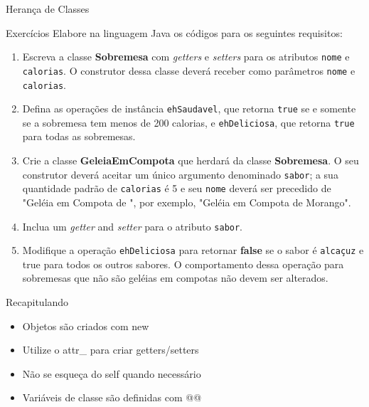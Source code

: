 \begin{frame}{Herança de Classes}    
  
 
\end{frame}

\begin{frame}{Exercícios}
Elabore na linguagem Java os códigos para os seguintes requisitos:
    \begin{enumerate}
          \item Escreva a classe \textbf{Sobremesa} com \textit{getters} e \textit{setters} para os atributos \texttt{nome} e \texttt{calorias}. O construtor dessa classe deverá receber como parâmetros \texttt{nome} e \texttt{calorias}.      
          \item Defina as operações de instância \texttt{ehSaudavel}, que retorna \texttt{true} se e somente se a sobremesa tem menos de 200 calorias, e \texttt{ehDeliciosa}, que retorna \texttt{true} para todas as sobremesas.
          \item Crie a classe \textbf{GeleiaEmCompota} que herdará da classe \textbf{Sobremesa}. O seu construtor deverá aceitar um único argumento denominado \texttt{sabor};  a sua quantidade padrão de \texttt{calorias} é 5 e seu \texttt{nome} deverá ser precedido de "Geléia em Compota de ", por exemplo, "Geléia em Compota de Morango".
          \item Inclua um \textit{getter} and \textit{setter} para o atributo \texttt{sabor}.   
          \item Modifique a operação \texttt{ehDeliciosa} para retornar \textbf{false} se o sabor é \texttt{alcaçuz} e true para todos os outros sabores. O comportamento dessa operação para sobremesas que não são geléias em compotas não devem ser alterados.
       \end{enumerate}  
    
\end{frame}


\begin{frame}[fragile,t]{Recapitulando}
  \begin{itemize}
    \item Objetos são criados com \alert{new}
    \item Utilize o \alert{attr\_} para criar getters/setters
    \item Não se esqueça do \alert{self} quando necessário
    \item Variáveis de classe são definidas com \alert{@@}
  \end{itemize}
\end{frame}



